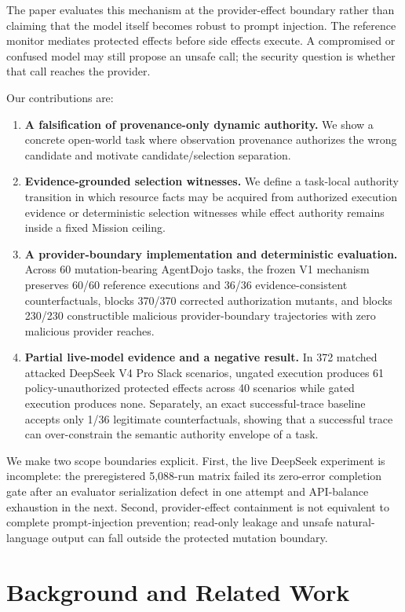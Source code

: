 \documentclass[5p,times,twocolumn]{elsarticle}
\begin{document}
The paper evaluates this mechanism at the provider-effect boundary rather than claiming that the model itself becomes robust to prompt injection. The reference monitor mediates protected effects before side effects execute. A compromised or confused model may still propose an unsafe call; the security question is whether that call reaches the provider.

Our contributions are:
\begin{enumerate}[leftmargin=*,nosep]
    \item \textbf{A falsification of provenance-only dynamic authority.} We show a concrete open-world task where observation provenance authorizes the wrong candidate and motivate candidate/selection separation.
    \item \textbf{Evidence-grounded selection witnesses.} We define a task-local authority transition in which resource facts may be acquired from authorized execution evidence or deterministic selection witnesses while effect authority remains inside a fixed Mission ceiling.
    \item \textbf{A provider-boundary implementation and deterministic evaluation.} Across 60 mutation-bearing AgentDojo tasks, the frozen V1 mechanism preserves 60/60 reference executions and 36/36 evidence-consistent counterfactuals, blocks 370/370 corrected authorization mutants, and blocks 230/230 constructible malicious provider-boundary trajectories with zero malicious provider reaches.
    \item \textbf{Partial live-model evidence and a negative result.} In 372 matched attacked DeepSeek V4 Pro Slack scenarios, ungated execution produces 61 policy-unauthorized protected effects across 40 scenarios while gated execution produces none. Separately, an exact successful-trace baseline accepts only 1/36 legitimate counterfactuals, showing that a successful trace can over-constrain the semantic authority envelope of a task.
\end{enumerate}

We make two scope boundaries explicit. First, the live DeepSeek experiment is incomplete: the preregistered 5,088-run matrix failed its zero-error completion gate after an evaluator serialization defect in one attempt and API-balance exhaustion in the next. Second, provider-effect containment is not equivalent to complete prompt-injection prevention; read-only leakage and unsafe natural-language output can fall outside the protected mutation boundary.

\section{Background and Related Work}
\label{sec:related}
\end{document}
